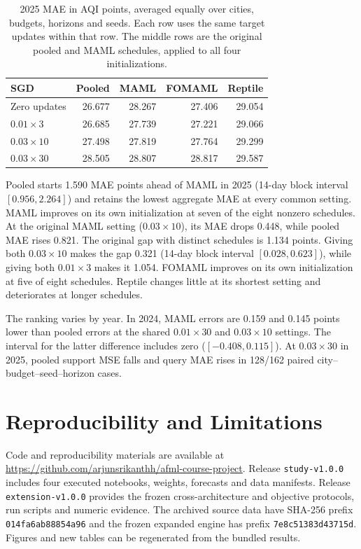 \documentclass[conference]{IEEEtran}
\begin{document}
\begin{table}[t]
\caption{2025 MAE in AQI points, averaged equally over cities, budgets, horizons and seeds. Each row uses the same target updates within that row. The middle rows are the original pooled and MAML schedules, applied to all four initializations.}
\label{tab:matchedupdates}
\centering\small
\begin{tabular}{lrrrr}\toprule
SGD & Pooled & MAML & FOMAML & Reptile\\\midrule
Zero updates & 26.677 & 28.267 & 27.406 & 29.054\\
$0.01\times3$ & 26.685 & 27.739 & 27.221 & 29.066\\
$0.03\times10$ & 27.498 & 27.819 & 27.764 & 29.299\\
$0.03\times30$ & 28.505 & 28.807 & 28.817 & 29.587\\\bottomrule
\end{tabular}
\end{table}

Pooled starts 1.590 MAE points ahead of MAML in 2025 (14-day block interval $[0.956,2.264]$) and retains the lowest aggregate MAE at every common setting. MAML improves on its own initialization at seven of the eight nonzero schedules. At the original MAML setting ($0.03\times10$), its MAE drops 0.448, while pooled MAE rises 0.821. The original gap with distinct schedules is 1.134 points. Giving both $0.03\times10$ makes the gap 0.321 (14-day block interval $[0.028,0.623]$), while giving both $0.01\times3$ makes it 1.054. FOMAML improves on its own initialization at five of eight schedules. Reptile changes little at its shortest setting and deteriorates at longer schedules.

The ranking varies by year. In 2024, MAML errors are 0.159 and 0.145 points lower than pooled errors at the shared $0.01\times30$ and $0.03\times10$ settings. The interval for the latter difference includes zero ($[-0.408,0.115]$). At $0.03\times30$ in 2025, pooled support MSE falls and query MAE rises in 128/162 paired city--budget--seed--horizon cases.





\section{Reproducibility and Limitations}
Code and reproducibility materials are available at \url{https://github.com/arjunsrikanthh/afml-course-project}. Release \texttt{study-v1.0.0} includes four executed notebooks, weights, forecasts and data manifests. Release \texttt{extension-v1.0.0} provides the frozen cross-architecture and objective protocols, run scripts and numeric evidence. The archived source data have SHA-256 prefix \texttt{014fa6ab88854a96} and the frozen expanded engine has prefix \texttt{7e8c51383d43715d}. Figures and new tables can be regenerated from the bundled results.
\end{document}
